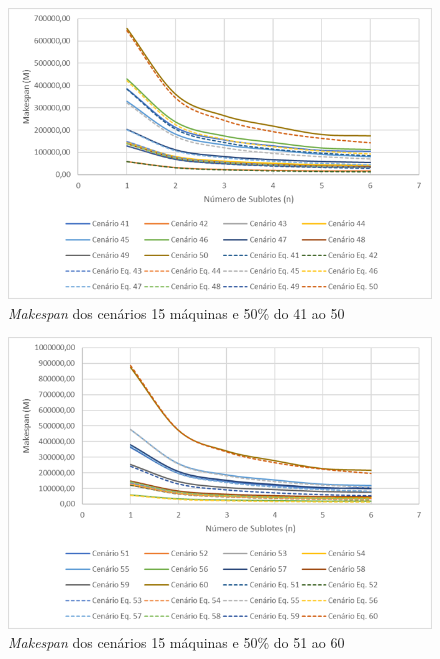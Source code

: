 \begin{figure}[H]
    \centering
     \includegraphics[width=13cm]{Apendices/Figuras/15m50_41-50.png}
     \caption{\textit{Makespan} dos cenários 15 máquinas e 50\% do 41 ao 50}
    \label{fig:15m50_41-50}
\end{figure}

\begin{figure}[H]
    \centering
     \includegraphics[width=13cm]{Apendices/Figuras/15m50_51-60.png}
     \caption{\textit{Makespan} dos cenários 15 máquinas e 50\% do 51 ao 60}
    \label{fig:15m50_51-60}
\end{figure}

